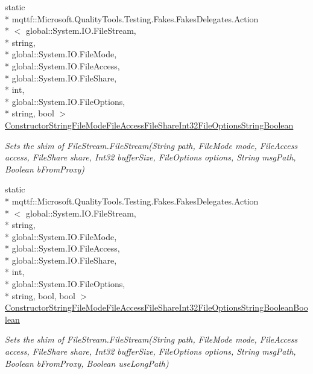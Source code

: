 \begin{DoxyCompactItemize}
static \\*
mqttf\-::\-Microsoft.\-Quality\-Tools.\-Testing.\-Fakes.\-Fakes\-Delegates.\-Action\\*
$<$ global\-::\-System.\-I\-O.\-File\-Stream, \\*
string, \\*
global\-::\-System.\-I\-O.\-File\-Mode, \\*
global\-::\-System.\-I\-O.\-File\-Access, \\*
global\-::\-System.\-I\-O.\-File\-Share, \\*
int, \\*
global\-::\-System.\-I\-O.\-File\-Options, \\*
string, bool $>$ \hyperlink{class_system_1_1_i_o_1_1_fakes_1_1_shim_file_stream_ac68b9377f47615f68a21d93825db5c8b}{Constructor\-String\-File\-Mode\-File\-Access\-File\-Share\-Int32\-File\-Options\-String\-Boolean}
\begin{DoxyCompactList}\small\item\em Sets the shim of File\-Stream.\-File\-Stream(\-String path, File\-Mode mode, File\-Access access, File\-Share share, Int32 buffer\-Size, File\-Options options, String msg\-Path, Boolean b\-From\-Proxy)\end{DoxyCompactList}\item 
static \\*
mqttf\-::\-Microsoft.\-Quality\-Tools.\-Testing.\-Fakes.\-Fakes\-Delegates.\-Action\\*
$<$ global\-::\-System.\-I\-O.\-File\-Stream, \\*
string, \\*
global\-::\-System.\-I\-O.\-File\-Mode, \\*
global\-::\-System.\-I\-O.\-File\-Access, \\*
global\-::\-System.\-I\-O.\-File\-Share, \\*
int, \\*
global\-::\-System.\-I\-O.\-File\-Options, \\*
string, bool, bool $>$ \hyperlink{class_system_1_1_i_o_1_1_fakes_1_1_shim_file_stream_a87c427a6d75e0bee781c975e9bbe4769}{Constructor\-String\-File\-Mode\-File\-Access\-File\-Share\-Int32\-File\-Options\-String\-Boolean\-Boolean}
\begin{DoxyCompactList}\small\item\em Sets the shim of File\-Stream.\-File\-Stream(\-String path, File\-Mode mode, File\-Access access, File\-Share share, Int32 buffer\-Size, File\-Options options, String msg\-Path, Boolean b\-From\-Proxy, Boolean use\-Long\-Path)\end{DoxyCompactList}\item 

\end{DoxyCompactItemize}
